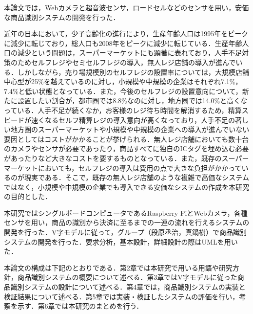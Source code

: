 


本論文では，Webカメラと超音波センサ，ロードセルなどのセンサを用い，安価な商品識別システムの開発を行った．

近年の日本において，少子高齢化の進行により，生産年齢人口は1995年をピークに減少に転じており，総人口も2008年をピークに減少に転じている\cite{population}．生産年齢人口の減少という問題は，スーパーマーケットにも顕著に表れており，人手不足対策のためセルフレジやセミセルフレジの導入，無人レジ店舗の導入が進んでいる．しかしながら，売り場規模別のセルフレジの設置率については，大規模店舗中心型が25\%を越えているのに対し，小規模や中規模の企業はそれぞれ7.1\%，7.4\%\cite{super}と低い状態となっている．また，今後のセルフレジの設置意向について，新たに設置したい割合が，都市圏では8.8\%なのに対し，地方圏では14.0\%\cite{super}と高くなっている．人手不足が続くなか，お客様のレジ待ち時間を解消するため，精算スピードが速くなるセルフ精算レジの導入意向が高くなって\cite{super}おり，人手不足の著しい地方圏のスーパーマーケットや小規模や中規模の企業への導入が進んでいない要因としてはコストがかかることが挙げられる．無人レジ店舗においても数十台のカメラやセンサが必要であったり，商品すべてに独自のICタグを埋め込む必要があったりなど大きなコストを要するものとなっている．また，既存のスーパーマーケットにおいても，セルフレジの導入は費用の点で大きな負担がかかっているのが現実である．そこで，既存の無人レジ店舗のような複雑で高価なシステムではなく，小規模や中規模の企業でも導入できる安価なシステムの作成を本研究の目的とした．

本研究ではシングルボードコンピュータであるRaspberry PiとWebカメラ，各種センサを用い，商品の識別から決済に至るまでの一連の流れを行えるシステムの開発を行った．V字モデルに従って，グループ（段原丞治，真鍋樹）で商品識別システムの開発を行った．要求分析，基本設計，詳細設計の際はUMLを用いた．

本論文の構成は下記のとおりである．第2章では本研究で用いる用語や研究方針，商品識別システムの概要について述べる．第3章ではV字モデルに従った商品識別システムの設計について述べる．第4章では，商品識別システムの実装と検証結果について述べる．第5章では実装・検証したシステムの評価を行い，考察を示す．第6章では本研究のまとめを行う．
